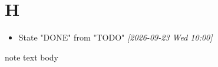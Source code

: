 \section*{H}
\label{sec:org4be7048}
\begin{itemize}
\item State "DONE" from "TODO" \textit{{[}2026-09-23 Wed 10:00]}
\end{itemize}
note text
body
